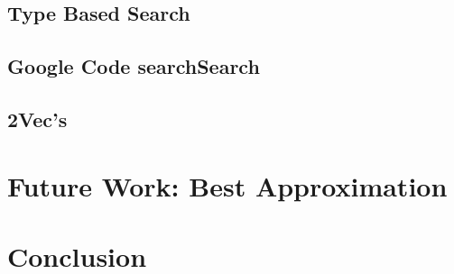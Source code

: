 \documentclass[12pt]{article}
\theoremstyle{plain}
\begin{document}
\subsection{Type Based Search}

\subsection{Google Code searchSearch}

\subsection{2Vec's}

\section{Future Work: Best Approximation}

\section{Conclusion}



\end{document}
